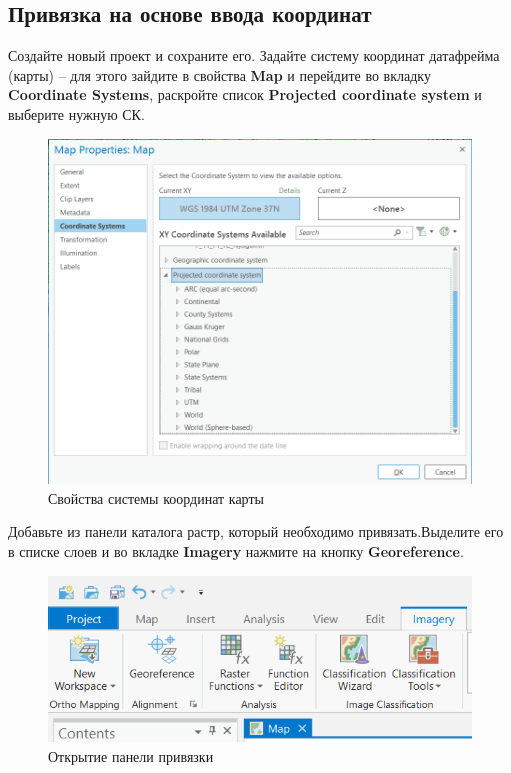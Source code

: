 \documentclass[
  12pt,
]{book}
\begin{document}
\hypertarget{ux43fux440ux438ux432ux44fux437ux43aux430-ux43dux430-ux43eux441ux43dux43eux432ux435-ux432ux432ux43eux434ux430-ux43aux43eux43eux440ux434ux438ux43dux430ux442}{%
\subsection{Привязка на основе ввода координат}\label{ux43fux440ux438ux432ux44fux437ux43aux430-ux43dux430-ux43eux441ux43dux43eux432ux435-ux432ux432ux43eux434ux430-ux43aux43eux43eux440ux434ux438ux43dux430ux442}}

Создайте новый проект и сохраните его. Задайте систему координат датафрейма (карты) -- для этого зайдите в свойства \textbf{Map} и перейдите во вкладку \textbf{Coordinate Systems}, раскройте список \textbf{Projected coordinate system} и выберите нужную СК.

\begin{figure}
\centering
\includegraphics{images/Ref02/Arc_mapCRS.png}
\caption{Свойства системы координат карты}
\end{figure}

Добавьте из панели каталога растр, который необходимо привязать.Выделите его в списке слоев и во вкладке \textbf{Imagery} нажмите на кнопку \textbf{Georeference}.

\begin{figure}
\centering
\includegraphics{images/Ref02/Arc_georeference.png}
\caption{Открытие панели привязки}
\end{figure}
\end{document}
